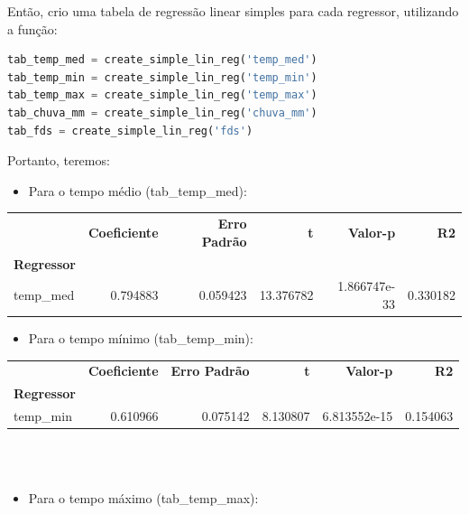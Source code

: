 \documentclass[a4paper, 12pt]{article}
\begin{document}
Então, crio uma tabela de regressão linear simples para cada regressor, utilizando a função:

\begin{tcolorbox}[colback=white,boxrule=1pt,arc=5pt,auto outer arc]
  \begin{lstlisting}[language=Python]
tab_temp_med = create_simple_lin_reg('temp_med')
tab_temp_min = create_simple_lin_reg('temp_min')
tab_temp_max = create_simple_lin_reg('temp_max')
tab_chuva_mm = create_simple_lin_reg('chuva_mm')
tab_fds = create_simple_lin_reg('fds')
    \end{lstlisting}
\end{tcolorbox}

Portanto, teremos:

\begin{itemize}
    \item Para o tempo médio (tab\_temp\_med):
\end{itemize}

\begin{tabular}{lrrrrr}
\toprule
{} &  \textbf{Coeficiente} &  \textbf{Erro Padrão} &          \textbf{t} &       \textbf{Valor-p} &        \textbf{R2} \\
\textbf{Regressor} &              &              &            &               &           \\
\midrule
temp\_med  &     0.794883 &     0.059423 &  13.376782 &  1.866747e-33 &  0.330182 \\
\bottomrule
\end{tabular}

\begin{itemize}
    \item Para o tempo mínimo (tab\_temp\_min):
\end{itemize}

\begin{tabular}{lrrrrr}
\toprule
{} &  \textbf{Coeficiente} &  \textbf{Erro Padrão} &         \textbf{t} &       \textbf{Valor-p} &        \textbf{R2} \\
\textbf{Regressor} &              &              &           &               &           \\
\midrule
temp\_min  &     0.610966 &     0.075142 &  8.130807 &  6.813552e-15 &  0.154063 \\
\bottomrule
\end{tabular} \\ \\

\begin{itemize}
    \item Para o tempo máximo (tab\_temp\_max):
\end{itemize}
\end{document}
